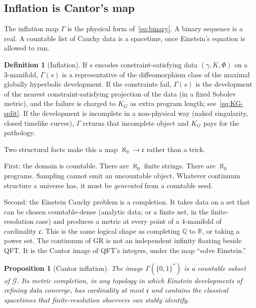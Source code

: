 \documentclass[11pt,a4paper]{article}
\theoremstyle{plain}
\newtheorem{proposition}[theorem]{Proposition}
\theoremstyle{definition}
\newtheorem{definition}[theorem]{Definition}
\theoremstyle{remark}
\newcommand{\Q}{\mathbb{Q}}
\newcommand{\R}{\mathbb{R}}
\newcommand{\alef}{\aleph_{0}}
\newcommand{\cont}{\mathfrak{c}}
\newcommand{\Geo}{\mathcal{G}}
\newcommand{\KG}{K_{G}}
\begin{document}
\subsection{Inflation is Cantor's map}

The inflation map $\Gamma$ is the physical form of~\eqref{eq:binary}.
A binary sequence is a real.
A countable list of Cauchy data is a spacetime, once Einstein's equation is allowed to run.

\begin{definition}[Inflation]
If $s$ encodes constraint-satisfying data $(\gamma,K,\Phi)$ on a $3$-manifold, $\Gamma(s)$ is a representative of the diffeomorphism class of the maximal globally hyperbolic development.
If the constraints fail, $\Gamma(s)$ is the development of the nearest constraint-satisfying projection of the data (in a fixed Sobolev metric), and the failure is charged to $\KG$ as extra program length; see~\eqref{eq:KG-split}.
If the development is incomplete in a non-physical way (naked singularity, closed timelike curves), $\Gamma$ returns that incomplete object and $\KG$ pays for the pathology.
\end{definition}

Two structural facts make this a map $\alef\to\cont$ rather than a trick.

First: the domain is countable.
There are $\alef$ finite strings.
There are $\alef$ programs.
Sampling cannot emit an uncountable object.
Whatever continuum structure a universe has, it must be \emph{generated} from a countable seed.

Second: the Einstein Cauchy problem is a completion.
It takes data on a set that can be chosen countable-dense (analytic data; or a finite net, in the finite-resolution case) and produces a metric at every point of a $4$-manifold of cardinality $\cont$.
This is the same logical shape as completing $\Q$ to $\R$, or taking a power set.
The continuum of GR is not an independent infinity floating beside QFT.
It is the Cantor image of QFT's integers, under the map ``solve Einstein.''

\begin{proposition}[Cantor inflation]
\label{prop:cantor-inf}
The image $\Gamma(\{0,1\}^{*})$ is a countable subset of $\Geo$.
Its metric completion, in any topology in which Einstein developments of refining data converge, has cardinality at most $\cont$ and contains the classical spacetimes that finite-resolution observers can stably identify.
\end{proposition}
\end{document}
